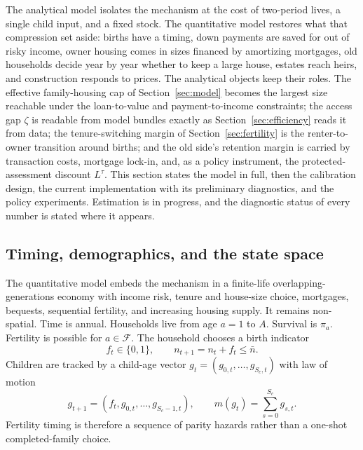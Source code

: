 \documentclass[11pt]{article}
\newcommand{\1}{\mathbf 1}
\begin{document}
The analytical model isolates the mechanism at the cost of two-period lives, a single child input, and a fixed stock. The quantitative model restores what that compression set aside: births have a timing, down payments are saved for out of risky income, owner housing comes in sizes financed by amortizing mortgages, old households decide year by year whether to keep a large house, estates reach heirs, and construction responds to prices. The analytical objects keep their roles. The effective family-housing cap of Section~\ref{sec:model} becomes the largest size reachable under the loan-to-value and payment-to-income constraints; the access gap $\zeta$ is readable from model bundles exactly as Section~\ref{sec:efficiency} reads it from data; the tenure-switching margin of Section~\ref{sec:fertility} is the renter-to-owner transition around births; and the old side's retention margin is carried by transaction costs, mortgage lock-in, and, as a policy instrument, the protected-assessment discount $L^\tau$. This section states the model in full, then the calibration design, the current implementation with its preliminary diagnostics, and the policy experiments. Estimation is in progress, and the diagnostic status of every number is stated where it appears.

\subsection{Timing, demographics, and the state space}

The quantitative model embeds the mechanism in a finite-life overlapping-generations economy with income risk, tenure and house-size choice, mortgages, bequests, sequential fertility, and increasing housing supply. It remains non-spatial. Time is annual. Households live from age $a=1$ to $A$. Survival is $\pi_a$. Fertility is possible for $a\in\mathcal F$. The household chooses a birth indicator
\begin{equation}
f_t\in\{0,1\},\qquad n_{t+1}=n_t+f_t\le\bar n.
\label{eq:birth_indicator_quant}
\end{equation}
Children are tracked by a child-age vector $g_t=(g_{0,t},\ldots,g_{S_c,t})$ with law of motion
\begin{equation}
g_{t+1}=(f_t,g_{0,t},\ldots,g_{S_c-1,t}),
\qquad m(g_t)=\sum_{s=0}^{S_c}g_{s,t}.
\label{eq:child_aging_quant}
\end{equation}
Fertility timing is therefore a sequence of parity hazards rather than a one-shot completed-family choice.
\end{document}

